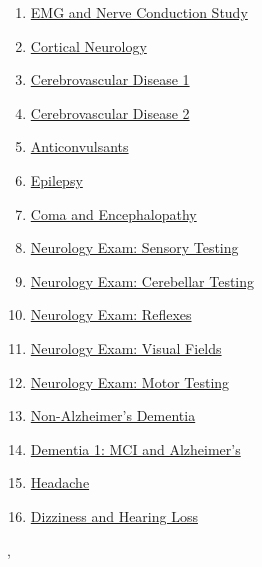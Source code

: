 \documentclass[11pt]{article}
\renewcommand{\today}{\shortmonthname[\the\month] \the \day,  \the\year}
\begin{document}
\begin{multicols}{2}
\begin{enumerate}
		\item \href{https://mp.weixin.qq.com/s/adfsuZy_2aGLxjAmS5TErg}{EMG and Nerve Conduction Study}	%
		\item \href{https://mp.weixin.qq.com/s/FY84gbaD9vAYeDm8TG5Mhg}{Cortical Neurology}	%
		\item \href{https://mp.weixin.qq.com/s/MmPwpRD1CXUnlrYxcS56Nw}{Cerebrovascular Disease 1}	%
		\item \href{https://mp.weixin.qq.com/s/acjJ-nlnmvOn0_7_r06R4Q}{Cerebrovascular Disease 2}	%
		\item \href{https://mp.weixin.qq.com/s/D4iwmpXM3gnyK7UrvWfzgA}{Anticonvulsants}	%
		\item \href{https://mp.weixin.qq.com/s/2LxYUKjOdPPLrhu1ViuR5w}{Epilepsy}	%
		\item \href{https://mp.weixin.qq.com/s/P9t5yeBDnrNRaLKpdr1enA}{Coma and Encephalopathy}	%
		\item \href{https://mp.weixin.qq.com/s/EzskUN09xPqkZXw-Uvpgtg}{Neurology Exam: Sensory Testing}	%
		\item \href{https://mp.weixin.qq.com/s/xRo3Jfkxm0u_Qnx5D6NW9g}{Neurology Exam: Cerebellar Testing}	%
		\item \href{https://mp.weixin.qq.com/s/XD3f0ajjSUlLXPYIMJexXg}{Neurology Exam: Reflexes}	%
		\item \href{https://mp.weixin.qq.com/s/6Y3xN9ojowBf3IChMnCUeQ}{Neurology Exam: Visual Fields}	%
		\item \href{https://mp.weixin.qq.com/s/kmddPIsuyxyMsW6I6LNHng}{Neurology Exam: Motor Testing}	%
		\item \href{https://mp.weixin.qq.com/s/sfFtHjAFQ5nfHm2BCLJytw}{Non-Alzheimer's Dementia}	%
		\item \href{https://mp.weixin.qq.com/s/XYp2_YRDRWNaNiJ8uDtUjg}{Dementia 1: MCI and Alzheimer's}	%
		\item \href{https://mp.weixin.qq.com/s/KVQ7MiiDpGMuFmriT4_22A}{Headache}	%
		\item \href{https://mp.weixin.qq.com/s/faKIFBM1NqoQbBRzhGb2dQ}{Dizziness and Hearing Loss}	%
	\end{enumerate}
\end{multicols}





%
\begin{flushright}
	\tiny \today 
\end{flushright}
\end{document}
